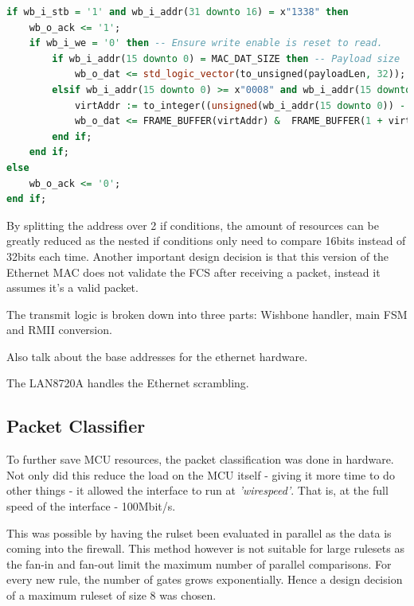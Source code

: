 \begin{lstlisting}[language=VHDL, caption=Wishbone access logic for Ethernet receive]
if wb_i_stb = '1' and wb_i_addr(31 downto 16) = x"1338" then 
    wb_o_ack <= '1';
    if wb_i_we = '0' then -- Ensure write enable is reset to read.
        if wb_i_addr(15 downto 0) = MAC_DAT_SIZE then -- Payload size
            wb_o_dat <= std_logic_vector(to_unsigned(payloadLen, 32));
        elsif wb_i_addr(15 downto 0) >= x"0008" and wb_i_addr(15 downto 0) <= x"05F8" then -- BRAM access
            virtAddr := to_integer((unsigned(wb_i_addr(15 downto 0)) - 8));
            wb_o_dat <= FRAME_BUFFER(virtAddr) &  FRAME_BUFFER(1 + virtAddr) & FRAME_BUFFER(2 + virtAddr) & FRAME_BUFFER(3 + virtAddr);
        end if;
    end if;
else
    wb_o_ack <= '0';
end if;
\end{lstlisting}

By splitting the address over 2 if conditions, the amount of resources can be greatly reduced as the nested if conditions only need to compare 16bits instead of 32bits each time. Another important design decision is that this version of the Ethernet MAC does not validate the FCS after receiving a packet, instead it assumes it's a valid packet. 


The transmit logic is broken down into three parts: Wishbone handler, main FSM and RMII conversion.





Also talk about the base addresses for the ethernet hardware.

The LAN8720A handles the Ethernet scrambling.












\subsection{Packet Classifier}
\label{sec:packet_classifier}
To further save MCU resources, the packet classification was done in hardware. Not only did this reduce the load on the MCU itself - giving it more time to do other things - it allowed the interface to run at \textit{'wirespeed'}. That is, at the full speed of the interface - 100Mbit/s. 

This was possible by having the rulset been evaluated in parallel as the data is coming into the firewall. This method however is not suitable for large rulesets as the fan-in and fan-out limit the maximum number of parallel comparisons. For every new rule, the number of gates grows exponentially. Hence a design decision of a maximum ruleset of size 8 was chosen. 

